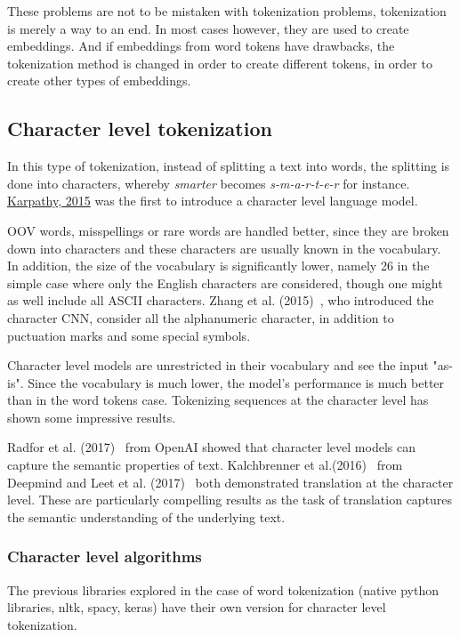 These problems are not to be mistaken with tokenization problems, tokenization is merely a way to an end. In most cases however, they are used to create embeddings. And if embeddings from word tokens have drawbacks, the tokenization method is changed in order to create different tokens, in order to create other types of embeddings.
    
\subsection{Character level tokenization}

In this type of tokenization, instead of splitting a text into words, the splitting is done into characters, whereby \emph{smarter} becomes \emph{s-m-a-r-t-e-r} for instance. \href{https://github.com/karpathy/char-rnn}{Karpathy, 2015} was the first to introduce a character level language model.

OOV words, misspellings or rare words are handled better, since they are broken down into characters and these characters are usually known in the vocabulary. In addition, the size of the vocabulary is significantly lower, namely 26 in the simple case where only the English characters are considered, though one might as well include all ASCII characters. Zhang et al. (2015)~\cite{zhang2015text}, who introduced the character CNN, consider all the alphanumeric character, in addition to puctuation marks and some special symbols.

Character level models are unrestricted in their vocabulary and see the input "as-is". Since the vocabulary is much lower, the model's performance is much better than in the word tokens case. Tokenizing sequences at the character level has shown some impressive results.

Radfor et al. (2017)~\cite{radford2017learning} from OpenAI showed that character level models can capture the semantic properties of text. Kalchbrenner et al.(2016)~\cite{kalchbrenner2016neural} from Deepmind and Leet et al. (2017)~\cite{lee-etal-2017-fully} both demonstrated translation at the character level. These are particularly compelling results as the task of translation captures the semantic understanding of the underlying text.

\subsubsection{Character level algorithms}

The previous libraries explored in the case of word tokenization (native python libraries, nltk, spacy, keras) have their own version for character level tokenization.

